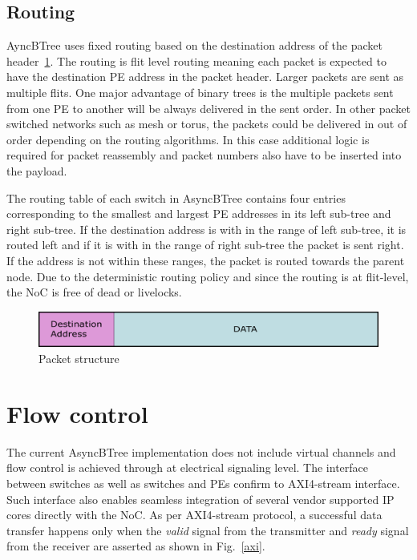 \subsection{Routing}
\label{sec:routing}
AyncBTree uses fixed routing based on the destination address of the packet header~\ref{fig:packet}.
The routing is flit level routing meaning each packet is expected to have the destination PE address in the packet header.
Larger packets are sent as multiple flits.
One major advantage of binary trees is the multiple packets sent from one PE to another will be always delivered in the sent order.
In other packet switched networks such as mesh or torus, the packets could be delivered in out of order depending on the routing algorithms.
In this case additional logic is required for packet reassembly and packet numbers also have to be inserted into the payload.

The routing table of each switch in AsyncBTree contains four entries corresponding to the smallest and largest PE addresses in its left sub-tree and right sub-tree.
If the destination address is with in the range of left sub-tree, it is routed left and if it is with in the range of right sub-tree the packet is sent right.
If the address is not within these ranges, the packet is routed towards the parent node.
Due to the deterministic routing policy and since the routing is at flit-level, the NoC is free of dead or livelocks.

\begin{figure}[t]
\centering
   \includegraphics[width=\columnwidth]{Figures/pckt_structure.pdf}
   \caption{Packet structure}
   \label{fig:packet}
\end{figure}

\section{Flow control}
The current AsyncBTree implementation does not include virtual channels and flow control is achieved through at electrical signaling level.
The interface between switches as well as switches and PEs confirm to AXI4-stream interface.
Such interface also enables seamless integration of several vendor supported IP cores directly with the NoC.
As per AXI4-stream protocol, a successful data transfer happens only when the \emph{valid} signal from the transmitter and \emph{ready} signal from the receiver are asserted as shown in Fig.~\ref{axi}.
